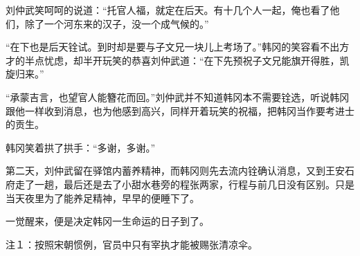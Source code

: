 刘仲武笑呵呵的说道：“托官人福，就定在后天。有十几个人一起，俺也看了他们，除了一个河东来的汉子，没一个成气候的。”

“在下也是后天铨试。到时却是要与子文兄一块儿上考场了。”韩冈的笑容看不出方才的半点忧虑，却半开玩笑的恭喜刘仲武道：“在下先预祝子文兄能旗开得胜，凯旋归来。”

“承蒙吉言，也望官人能簪花而回。”刘仲武并不知道韩冈本不需要铨选，听说韩冈跟他一样收到消息，也为他感到高兴，同样开着玩笑的祝福，把韩冈当作要考进士的贡生。

韩冈笑着拱了拱手：“多谢，多谢。”

第二天，刘仲武留在驿馆内蓄养精神，而韩冈则先去流内铨确认消息，又到王安石府走了一趟，最后还是去了小甜水巷旁的程张两家，行程与前几日没有区别。只是当天夜里为了能养足精神，早早的便睡下了。

一觉醒来，便是决定韩冈一生命运的日子到了。

注１：按照宋朝惯例，官员中只有宰执才能被赐张清凉伞。

